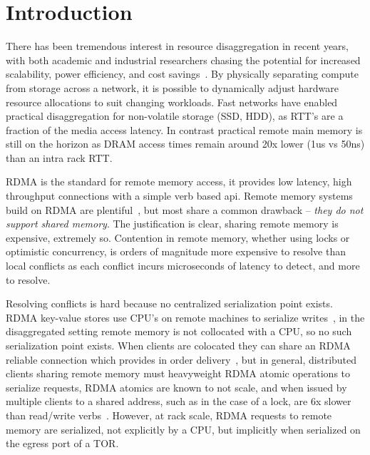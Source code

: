 \section{Introduction}

There has been tremendous interest in resource
disaggregation in recent years, with both academic and
industrial researchers chasing the potential for increased
scalability, power efficiency, and cost
savings~\cite{blade-server,fastswap,rethinking,the-machine,requirements,clio-arxiv,firebox,leap,zombieland,storm,aifm,legoos,supernic}.
By physically separating compute from storage across a
network, it is possible to dynamically adjust hardware
resource allocations to suit changing workloads. Fast
networks have enabled practical disaggregation for
non-volatile storage (SSD, HDD), as RTT's are a fraction of
the media access latency. In contrast practical remote main
memory is still on the horizon as DRAM access times remain
around 20x lower (1us vs 50ns) than an intra rack RTT.

RDMA is the standard for remote memory access, it provides
low latency, high throughput connections with a simple verb
based api. Remote memory systems build on RDMA are
plentiful~\cite{infiniswap,fastswap,legoos,clover,sherman,farm,reigons},
but most share a common drawback -- \textit{they do not
support shared memory}. The justification is clear, sharing
remote memory is expensive, extremely so. Contention in
remote memory, whether using locks or optimistic
concurrency, is orders of magnitude more expensive to
resolve than local conflicts as each conflict incurs
microseconds of latency to detect, and more to resolve.

Resolving conflicts is hard because no centralized
serialization point exists. RDMA key-value stores use CPU's
on remote machines to serialize
writes~\cite{herd,cell,farm,pilaf,storm}, in the
disaggregated setting remote memory is not collocated with a
CPU, so no such serialization point exists. When clients are
colocated they can share an RDMA reliable connection which
provides in order delivery~, but in general, distributed clients
sharing remote memory must heavyweight RDMA atomic
operations to serialize requests, RDMA atomics are known to
not scale, and when issued by multiple clients to a shared
address, such as in the case of a lock, are 6x slower than
read/write verbs~\cite{design-guidelines}. However, at rack
scale, RDMA requests to remote memory are serialized, not
explicitly by a CPU, but implicitly when serialized on the
egress port of a TOR.

